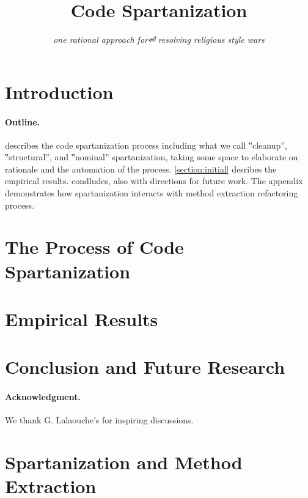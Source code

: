 \documentclass[preprint,10pt,nonatbib]{sigplanconf}
\title{Code Spartanization}
\subtitle{\scriptsize \emph{one rational approach for⏎ resolving religious style wars}}
\begin{document}
\maketitle

\def\ignore#1{}
\def\gal{\marginpar[G$⇒$]{$⇐$G}}
\def\yossi{\marginpar[Y$⇒$]{$⇐$Y}}
\def\matteo{\marginpar[M$⇒$]{$⇐$M}}

\begin{abstract}
  
\end{abstract}

\section{Introduction}


\paragraph{Outline.}  describes the code spartanization
process including what we call ‟cleanup”, ‟structural”, and ‟nominal”
spartanization, taking some space to elaborate on rationale and the automation
of the process. \cref{section:initial} desribes the empirical results.
 condludes, also with directions for future work.  The
appendix demonstrates how spartanization interacts with method extraction
refactoring process. 

\section{The Process of Code Spartanization}
\label{section:process}


\section{Empirical Results}
\label{section:empirical}


\section{Conclusion and Future Research}
\label{section:zz}


\paragraph{Acknowledgment.} We thank G. Lalaouche's for inspiring discussions.

\balance
\small


\eject
\appendix
\section{Spartanization and Method Extraction}
\label{section:techniques}

\end{document}
